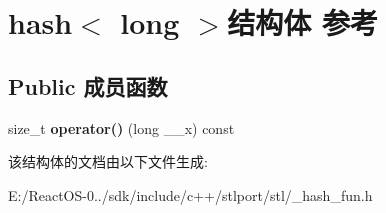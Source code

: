 \hypertarget{structhash_3_01long_01_4}{}\section{hash$<$ long $>$结构体 参考}
\label{structhash_3_01long_01_4}
\subsection*{Public 成员函数}
\begin{DoxyCompactItemize}
\item 
\mbox{\label{structhash_3_01long_01_4_a4a9ecd965eee0c55b2a5348c7831e2e0}} 
size\+\_\+t {\bfseries operator()} (long \+\_\+\+\_\+x) const
\end{DoxyCompactItemize}


该结构体的文档由以下文件生成\+:\begin{DoxyCompactItemize}
\item 
E\+:/\+React\+O\+S-\/0../sdk/include/c++/stlport/stl/\+\_\+hash\+\_\+fun.\+h\end{DoxyCompactItemize}
